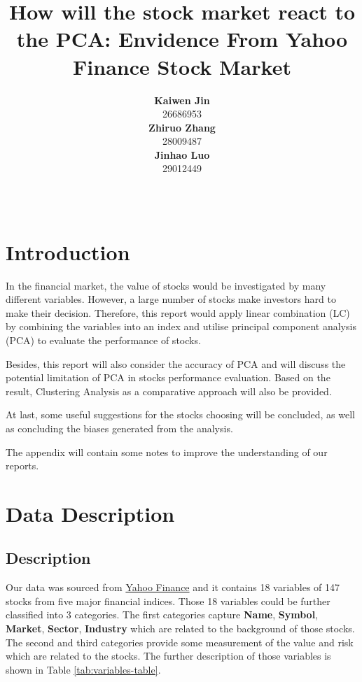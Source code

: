 \documentclass[11pt,a4paper,]{article}
\title{How will the stock market react to the PCA: Envidence From Yahoo Finance Stock Market}
\author{\sf\Large\textbf{ Kaiwen Jin}\\ {\sf\large 26686953\\[0.5cm]} \sf\Large\textbf{ Zhiruo Zhang}\\ {\sf\large 28009487\\[0.5cm]} \sf\Large\textbf{ Jinhao Luo}\\ {\sf\large 29012449\\[0.5cm]}}
\date{\sf\Date~\Month~\Year}
\makeatletter
\def\titlepage{\front{\expandafter{\@title}}{\@author}{\@organization}}
\makeatother
\begin{document}
\titlepage

{
\setcounter{tocdepth}{2}
\tableofcontents
}
\clearpage

\hypertarget{introduction}{%
\section{Introduction}\label{introduction}}

In the financial market, the value of stocks would be investigated by many different variables. However, a large number of stocks make investors hard to make their decision. Therefore, this report would apply linear combination (LC) by combining the variables into an index and utilise principal component analysis (PCA) to evaluate the performance of stocks.

Besides, this report will also consider the accuracy of PCA and will discuss the potential limitation of PCA in stocks performance evaluation. Based on the result, Clustering Analysis as a comparative approach will also be provided.

At last, some useful suggestions for the stocks choosing will be concluded, as well as concluding the biases generated from the analysis.

The appendix will contain some notes to improve the understanding of our reports.

\hypertarget{data-description}{%
\section{Data Description}\label{data-description}}

\hypertarget{description}{%
\subsection{Description}\label{description}}

Our data was sourced from \href{https://au.finance.yahoo.com/}{Yahoo Finance} and it contains 18 variables of 147 stocks from five major financial indices. Those 18 variables could be further classified into 3 categories. The first categories capture \textbf{Name}, \textbf{Symbol}, \textbf{Market}, \textbf{Sector}, \textbf{Industry} which are related to the background of those stocks. The second and third categories provide some measurement of the value and risk which are related to the stocks. The further description of those variables is shown in Table \ref{tab:variables-table}.
\end{document}
